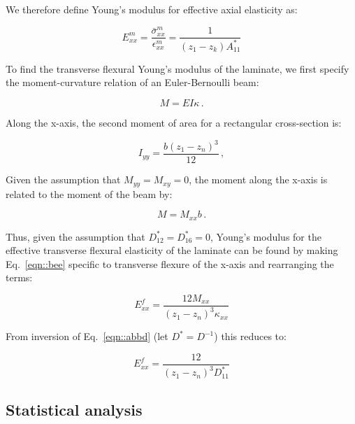\documentclass[twocolumn, linenumbers, superscriptaddress, nofootinbib]{revtex4-1}
\begin{document}
				We therefore define Young's modulus for effective axial elasticity as:
				
				\begin{equation}
					E^m_{xx} = \frac{\bar{\sigma}^m_{xx}}{\epsilon^m_{xx}} = \frac{1}{(z_1 - z_k)A^*_{11}}
				\end{equation}
				
				To find the transverse flexural Young's modulus of the laminate, we first specify the moment-curvature relation of an Euler-Bernoulli beam:
				
				\begin{equation}
				\label{eqn::bee}
				M = EI\kappa\,.
				\end{equation}
				
				Along the x-axis, the second moment of area for a rectangular cross-section is:
				
				\begin{equation}
					I_{yy} = \frac{b(z_1 - z_n)^3}{12}\,,
				\end{equation}	
				
				Given the assumption that $M_{yy} = M_{xy} = 0$, the moment along the x-axis is related to the moment of the beam by:
				
				\begin{equation}
					M = M_{xx}b\,.
				\end{equation}
				
				Thus, given the assumption that $D^*_{12} = D^*_{16} = 0$, Young's modulus for the effective transverse flexural elasticity of the laminate can be found by making Eq.~\ref{eqn::bee} specific to transverse flexure of the x-axis and rearranging the terms:
				
				\begin{equation}
					E^f_{xx} = \frac{12M_{xx}}{(z_1 - z_n)^3\kappa_{xx}}
				\end{equation}
				
				From inversion of Eq.~\ref{eqn::abbd} (let $D^* = D^{-1}$) this reduces to:
				
				\begin{equation}
					E^f_{xx} = \frac{12}{(z_1 - z_n)^3D^*_{11}}
				\end{equation}
					
		\subsection*{Statistical analysis}
\end{document}
